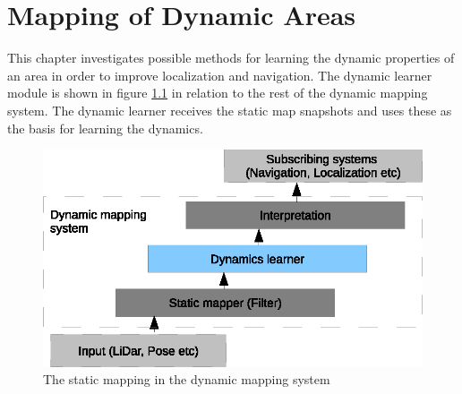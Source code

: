 \chapter{Mapping of Dynamic Areas}
\label{mapping_of_dynamic_areas}
This chapter investigates possible methods for learning the dynamic properties of an area in order to improve localization and navigation. The dynamic learner module is shown in figure \ref{fig:dynamic_learner_overview} in relation to the rest of the dynamic mapping system. The dynamic learner receives the static map snapshots and uses these as the basis for learning the dynamics.  


\begin{figure}[htbp]
	\centering
	\includegraphics[scale=1]{chapters/mapping_of_dynamic_areas/figures/dynamic_overview.eps}
	\caption{The static mapping in the dynamic mapping system}
	\label{fig:dynamic_learner_overview}
\end{figure}








